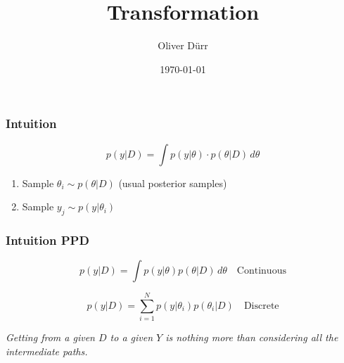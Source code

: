 \documentclass{beamer}
\title{Transformation}
\author{Oliver Dürr}
\date{\today}
\begin{document}
 
\frame{\titlepage}

\begin{frame}
\frametitle{Intuition}

\[
p(y|D) = \int p(y|\theta) \cdot p(\theta|D) \, d\theta 
\]

\begin{enumerate}
    \item Sample \( \theta_i \sim p(\theta|D) \) (usual posterior samples)
    \item Sample \( y_j \sim p(y|\theta_i) \)
\end{enumerate}
\end{frame}

\begin{frame}
\frametitle{Intuition PPD}

\[
p(y|D) = \int p(y|\theta) p(\theta|D) \, d\theta \quad \text{Continuous}
\]

\[
p(y|D) = \sum_{i=1}^{N} p(y|\theta_i) p(\theta_i|D) \quad \text{Discrete}
\]


\begin{center}
\end{center}
\begin{center}
\textit{Getting from a given $D$ to a given $Y$ is nothing more than considering all
the intermediate paths.}
\end{center}
\end{frame}
\end{document}
